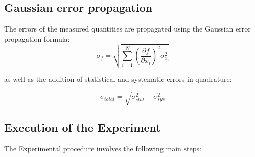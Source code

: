 \documentclass[12pt,a4paper,titlepage]{scrartcl}
\numberwithin{equation}{section}
\numberwithin{table}{section}
\numberwithin{figure}{section}
\begin{document}
\subsection{Gaussian error propagation}
The errors of the measured quantities are propagated using the Gaussian error propagation formula:
\begin{equation}
    \sigma_f = \sqrt{\sum_{i=1}^{N} \left(\frac{\partial f}{\partial x_i}\right)^2 \sigma_{x_i}^2}
\end{equation}

as well as the addition of statistical and systematic errors in quadrature:

\begin{equation}
    \sigma_{total} = \sqrt{\sigma_{stat}^2 + \sigma_{sys}^2}
\end{equation}



    



\subsection{Execution of the Experiment}
The Experimental procedure involves the following main steps:
\end{document}
